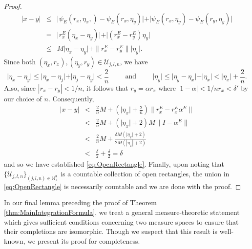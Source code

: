 \documentclass[11pt]{article}
\theoremstyle{remark}
\begin{document}
\begin{proof}
\begin{eqnarray*}
| x - y | &\leq& \vert \psi_E(r_x,\eta_x,) - \psi_E(r_x,\eta_y) \vert 
    + \vert \psi_E(r_x,\eta_y) - \psi_E(r_y,\eta_y) \vert\\
    &=&  \vert r_x^E (\eta_x - \eta_y) \vert + \vert (r_x^E - r_y^E) \eta_y \vert\\
    &\leq& M\vert \eta_x - \eta_y \vert + \|{r_x^E - r_y^E}\|  \vert \eta_y \vert.
\end{eqnarray*}
Since both $(\eta_x,r_x),(\eta_y,r_y) \in \mathcal{U}_{j,l,n}$, we have
\begin{equation*}
    \vert \eta_x - \eta_y \vert \leq \vert \eta_x - \eta_j \vert + \vert \eta_j - \eta_y \vert < \frac{2}{n}
\hspace{1cm}\mbox{and}\hspace{1cm}
    \vert \eta_y \vert \leq \vert \eta_y - \eta_x \vert + \vert \eta_x \vert < \vert \eta_x \vert + \frac{2}{n}.
\end{equation*}
Also, since $|r_x-r_y|<1/n$, it follows that $r_y=\alpha r_x$ where $|1-\alpha|<1/nr_x < \delta'$ by our choice of $n$. Consequently,
\begin{eqnarray*}
    \vert x - y \vert 
    &< & \frac{2}{n} M+ \left( \vert \eta_x \vert + \frac{2}{n} \right) \|{r_x^E -  r_x^E \alpha^E}\|   \\ 
    &<& \frac{2}{n}M + \left( \vert \eta_x \vert + 2 \right)M\| I - \alpha^E\| \\
    &<&  \frac{2}{n}M +  \frac{\delta M \left( \vert \eta_x \vert + 2\right) }{2M (| \eta_x | + 2)}  \\
    &<& \frac{\delta}{2} + \frac{\delta}{2}=\delta 
\end{eqnarray*}
and so we have established \eqref{eq:OpenRectangle}. Finally, upon noting that $\{\mathcal{U}_{j,l,n}\}_{(j,l,n)\in\mathbb{N}_+^3}$ is a countable collection of open rectangles, the union in \eqref{eq:OpenRectangle} is necessarily countable and we are done with the proof.
\end{proof}

\noindent In our final lemma preceding the proof of Theorem \ref{thm:MainIntegrationFormula}, we treat a general measure-theoretic statement which gives sufficient conditions concerning two measure spaces to ensure that their completions are isomorphic. Though we suspect that this result is well-known, we present its proof for completeness.
\end{document}
